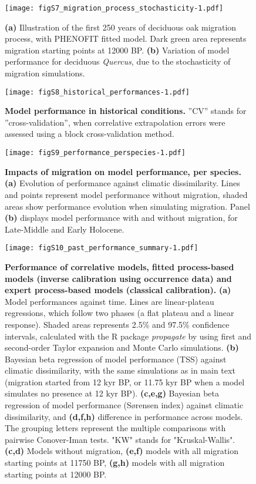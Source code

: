\documentclass[pdflatex, sn-nature, oneside]{sn-jnl}%
\begin{document}
\begin{figure}
\hspace*{-0.4in}
\centering
\texttt{[image: figS7\_migration\_process\_stochasticity-1.pdf]}
\caption{\textbf{(a)} Illustration of the first 250 years of deciduous oak migration process, with PHENOFIT fitted model. Dark green area represents migration starting points at 12000 BP. \textbf{(b)} Variation of model performance for deciduous \emph{Quercus},  due to the stochasticity of migration simulations.}
\end{figure}

\begin{figure}
\hspace*{-0.4in}
\centering
\texttt{[image: figS8\_historical\_performances-1.pdf]}
\caption{\textbf{Model performance in historical conditions.} ”CV” stands for ”cross-validation”, when
correlative extrapolation errors were assessed using a block cross-validation method.}
\end{figure}

\begin{figure}
\hspace*{-0.8in}
\centering
\texttt{[image: figS9\_performance\_perspecies-1.pdf]}
\caption{\textbf{Impacts of migration on model performance, per species.} \textbf{(a)} Evolution of performance against climatic dissimilarity. Lines and points represent model performance without migration, shaded areas show performance evolution when simulating migration. Panel \textbf{(b)} displays model performance with and without migration, for Late-Middle and Early Holocene.}
\end{figure}

\begin{figure}
\hspace*{-0.6in}
\vspace*{-0.2in}
\centering
\texttt{[image: figS10\_past\_performance\_summary-1.pdf]}
\caption{\textbf{Performance of correlative models, fitted process-based models (inverse calibration using occurrence data) and expert process-based models (classical calibration).}
\textbf{(a)} Model performances against time. Lines are linear-plateau regressions, which follow two phases (a flat plateau and a linear response). Shaded areas represents 2.5\% and 97.5\% confidence intervals, calculated with the R package \emph{propagate} \cite{Spiess2018} by using  first and second-order Taylor expansion and Monte Carlo simulations. \textbf{(b)} Bayesian beta regression of model performance (TSS) against climatic dissimilarity, with the same simulations as in main text (migration started from 12 kyr BP, or 11.75 kyr BP when a model simulates no presence at 12 kyr BP). \textbf{(c,e,g)} Bayesian beta regression of model performance (Sørensen index) against climatic dissimilarity, and \textbf{(d,f,h)} difference in performance across models. The grouping letters represent the multiple comparisons with pairwise Conover-Iman tests. "KW" stands for "Kruskal-Wallis".
\textbf{(c,d)} Models without migration, \textbf{(e,f)} models with all migration starting points at 11750 BP, \textbf{(g,h)} models with all migration starting points at 12000 BP.}
\end{figure}

\clearpage

 
\end{document}
